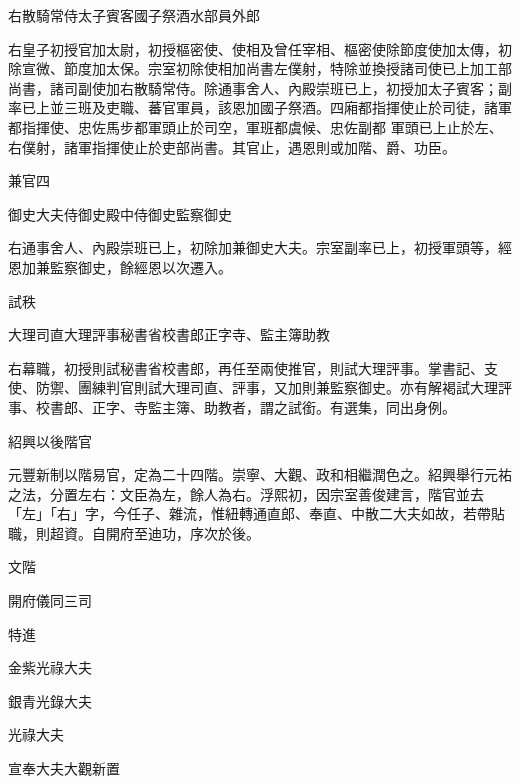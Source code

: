 \begin{pinyinscope}
 右散騎常侍太子賓客國子祭酒水部員外郎



 右皇子初授官加太尉，初授樞密使、使相及曾任宰相、樞密使除節度使加太傳，初除宣微、節度加太保。宗室初除使相加尚書左僕射，特除並換授諸司使已上加工部尚書，諸司副使加右散騎常侍。除通事舍人、內殿崇班已上，初授加太子賓客；副率已上並三班及吏職、蕃官軍員，該恩加國子祭酒。四廂都指揮使止於司徒，諸軍都指揮使、忠佐馬步都軍頭止於司空，軍班都虞候、忠佐副都
 軍頭已上止於左、右僕射，諸軍指揮使止於吏部尚書。其官止，遇恩則或加階、爵、功臣。



 兼官四



 御史大夫侍御史殿中侍御史監察御史



 右通事舍人、內殿崇班已上，初除加兼御史大夫。宗室副率已上，初授軍頭等，經恩加兼監察御史，餘經恩以次遷入。



 試秩



 大理司直大理評事秘書省校書郎正字寺、監主簿助教



 右幕職，初授則試秘書省校書郎，再任至兩使推官，則試大理評事。掌書記、支使、防禦、團練判官則試大理司直、評事，又加則兼監察御史。亦有解褐試大理評事、校書郎、正字、寺監主簿、助教者，謂之試銜。有選集，同出身例。



 紹興以後階官



 元豐新制以階易官，定為二十四階。崇寧、大觀、政和相繼潤色之。紹興舉行元祐之法，分置左右：文臣為左，餘人為右。浮熙初，因宗室善俊建言，階官並去「左」「右」字，今任子、雜流，惟紐轉通直郎、奉直、中散二大夫如故，若帶貼職，則超資。自開府至迪功，序次於後。



 文階



 開府儀同三司



 特進



 金紫光祿大夫



 銀青光錄大夫



 光祿大夫



 宣奉大夫大觀新置




\end{pinyinscope}
